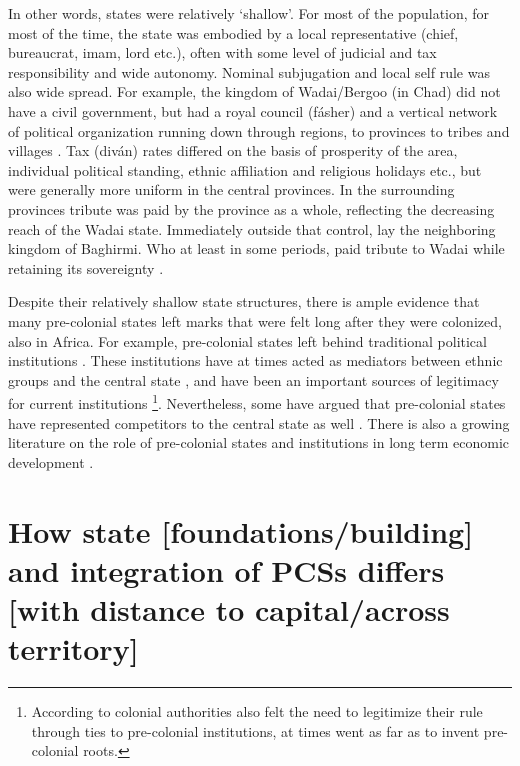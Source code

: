 \documentclass[12pt]{article}
\begin{document}

In other words, states were relatively `shallow'. For most of the
population, for most of the time, the state was embodied by a local
representative (chief, bureaucrat, imam, lord etc.), often with some level of
judicial and tax responsibility and wide autonomy. Nominal subjugation and local
self rule was also wide spread. For example, the kingdom of Wadai/Bergoo (in
Chad) did not have a civil government, but had a royal council (fásher) and a
vertical network of political organization running down through regions, to
provinces to tribes and villages \citep{barth1857travels}. Tax (diván) rates
differed on the basis of prosperity of the area, individual political standing,
ethnic affiliation and religious holidays etc., but were generally more uniform
in the central provinces. In the surrounding provinces tribute was paid by the
province as a whole, reflecting the decreasing reach of the Wadai state.
Immediately outside that control, lay the neighboring kingdom of Baghirmi. Who
at least in some periods, paid tribute to Wadai while retaining its sovereignty
\citep{barth1857travels}.

Despite their relatively shallow state structures, there is ample evidence that
many pre-colonial states left marks that were felt long after they were
colonized, also in Africa. For example, pre-colonial states left behind
traditional political institutions \citep{Beall_2005, Holzinger_2020,
Neupert_Wentz_2021, Ubink_2008}. These institutions have at times acted as
mediators between ethnic groups and the central state \citep{boone2014property,
Englebert2002}, and have been an important sources of legitimacy for current
institutions \citep{Wig2016}\footnote{According to \citet{mamdani2018citizen}
	colonial authorities also felt the need to legitimize their rule through
	ties to pre-colonial institutions, at times went as far as to invent
pre-colonial roots.}. Nevertheless, some have argued that pre-colonial states
have represented competitors to the central state as well \citep{Herbst2014}.
There is also a growing literature on the role of pre-colonial states and
institutions in long term economic development \citep{Michalopoulos2018,
Acemoglu2014, Gennaioli2007, Bockstette2002, Wilfahrt_2021}.

\section{How state [foundations/building] and integration of PCSs differs [with distance to
capital/across territory]} \label{State building and integration} 
\end{document}
